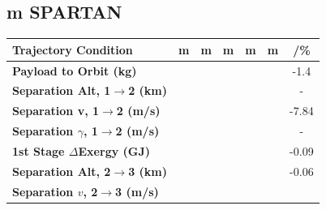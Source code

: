 \subsection{m SPARTAN}


\begin{table}[ht]
\centering
\begin{tabular}{l c c c c c c} 
	\hline \textbf{Trajectory Condition}
	&m
	&m
	&m
	&m
	&m
	& /\%
	\\
	\hline \textbf{Payload to Orbit (kg)}
	& \PayloadToOrbitmSPARTANNinetyFive
	& \PayloadToOrbitmSPARTANNinetySevenFive
	& \PayloadToOrbitmSPARTANStandard
	& \PayloadToOrbitmSPARTANOneHundredTwoFive
	& \PayloadToOrbitmSPARTANOneHundredFive
	&-1.4
	\\
	\textbf{Separation Alt, 1$\rightarrow$2 (km)}
	& \firstsecondSeparationAltmSPARTANNinetyFive
	& \firstsecondSeparationAltmSPARTANNinetySevenFive
	& \firstsecondSeparationAltmSPARTANStandard
	& \firstsecondSeparationAltmSPARTANOneHundredTwoFive
	& \firstsecondSeparationAltmSPARTANOneHundredFive
	& -
	\\
	\textbf{Separation v, 1$\rightarrow$2 (m/s)}
	& \firstsecondSeparationvmSPARTANNinetyFive
	& \firstsecondSeparationvmSPARTANNinetySevenFive
	& \firstsecondSeparationvmSPARTANStandard
	& \firstsecondSeparationvmSPARTANOneHundredTwoFive
	& \firstsecondSeparationvmSPARTANOneHundredFive
	&-7.84
	\\
	\textbf{Separation $\gamma$, 1$\rightarrow$2 (m/s)}
	& \firstsecondSeparationgammamSPARTANNinetyFive
	& \firstsecondSeparationgammamSPARTANNinetySevenFive
	& \firstsecondSeparationgammamSPARTANStandard
	& \firstsecondSeparationgammamSPARTANOneHundredTwoFive
	& \firstsecondSeparationgammamSPARTANOneHundredFive
	& -
	\\
	\textbf{1st Stage $\Delta$Exergy (GJ)}
	& \firstdExergymSPARTANNinetyFive
	& \firstdExergymSPARTANNinetySevenFive
	& \firstdExergymSPARTANStandard
	& \firstdExergymSPARTANOneHundredTwoFive
	& \firstdExergymSPARTANOneHundredFive
	&-0.09
	\\
	\textbf{Separation Alt, 2$\rightarrow$3 (km)}
	& \secondthirdSeparationAltmSPARTANNinetyFive
	& \secondthirdSeparationAltmSPARTANNinetySevenFive
	& \secondthirdSeparationAltmSPARTANStandard
	& \secondthirdSeparationAltmSPARTANOneHundredTwoFive
	& \secondthirdSeparationAltmSPARTANOneHundredFive
	&-0.06
	\\
	\textbf{Separation $v$, 2$\rightarrow$3 (m/s)}
	& \secondthirdSeparationvmSPARTANNinetyFive
	& \secondthirdSeparationvmSPARTANNinetySevenFive
	& \secondthirdSeparationvmSPARTANStandard

\end{tabular}
\end{table}
